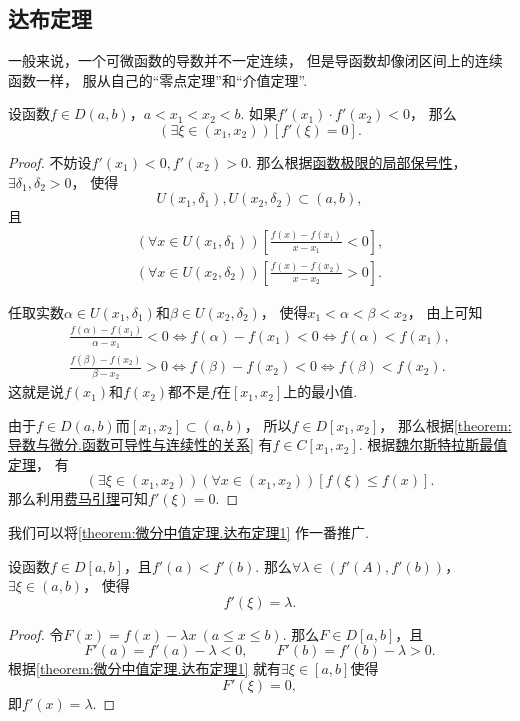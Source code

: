 \subsection{达布定理}
一般来说，一个可微函数的导数并不一定连续，
但是导函数却像闭区间上的连续函数一样，
服从自己的“零点定理”和“介值定理”.

\begin{theorem}[达布零点定理]\label{theorem:微分中值定理.达布定理1}
设函数\(f \in D(a,b)\)，\(a<x_1<x_2<b\).
如果\(f'(x_1) \cdot f'(x_2) < 0\)，
那么\[
	(\exists\xi\in(x_1,x_2))
	[f'(\xi) = 0].
\]
\begin{proof}
不妨设\(f'(x_1)<0,f'(x_2)>0\).
那么根据\hyperref[theorem:极限.函数极限的局部保号性1]{函数极限的局部保号性}，
\(\exists\delta_1,\delta_2>0\)，
使得\[
	U(x_1,\delta_1),U(x_2,\delta_2)\subset(a,b),
\]
且\[
	\begin{split}
		(\forall x \in U(x_1,\delta_1))
		\left[\frac{f(x)-f(x_1)}{x-x_1}<0\right], \\
		(\forall x \in U(x_2,\delta_2))
		\left[\frac{f(x)-f(x_2)}{x-x_2}>0\right].
	\end{split}
\]

任取实数\(\alpha \in U(x_1,\delta_1)\)和\(\beta \in U(x_2,\delta_2)\)，
使得\(x_1<\alpha<\beta<x_2\)，
由上可知\[
	\begin{split}
		\frac{f(\alpha)-f(x_1)}{\alpha-x_1}<0
		\iff
		f(\alpha)-f(x_1)<0
		\iff
		f(\alpha)<f(x_1), \\
		\frac{f(\beta)-f(x_2)}{\beta-x_2}>0
		\iff
		f(\beta)-f(x_2)<0
		\iff
		f(\beta)<f(x_2).
	\end{split}
\]
这就是说\(f(x_1)\)和\(f(x_2)\)都不是\(f\)在\([x_1,x_2]\)上的最小值.

由于\(f \in D(a,b)\)而\([x_1,x_2]\subset(a,b)\)，
所以\(f \in D[x_1,x_2]\)，
那么根据\cref{theorem:导数与微分.函数可导性与连续性的关系}
有\(f \in C[x_1,x_2]\).
根据\hyperref[theorem:极限.最值定理]{魏尔斯特拉斯最值定理}，
有\[
	(\exists\xi\in(x_1,x_2))
	(\forall x\in(x_1,x_2))
	[f(\xi) \leq f(x)].
\]
那么利用\hyperref[theorem:微分中值定理.费马引理]{费马引理}可知\(f'(\xi)=0\).
\end{proof}
\end{theorem}

我们可以将\cref{theorem:微分中值定理.达布定理1} 作一番推广.
\begin{theorem}[达布介值定理]\label{theorem:微分中值定理.达布定理2}
设函数\(f \in D[a,b]\)，且\(f'(a) < f'(b)\).
那么\(\forall\lambda\in(f'(A),f'(b))\)，\(\exists\xi\in(a,b)\)，
使得\[
	f'(\xi) = \lambda.
\]
\begin{proof}
令\(F(x) = f(x) - \lambda x\ (a \leq x \leq b)\).
那么\(F \in D[a,b]\)，且\[
	F'(a) = f'(a) - \lambda < 0, \qquad
	F'(b) = f'(b) - \lambda > 0.
\]
根据\cref{theorem:微分中值定理.达布定理1} 就有\(\exists\xi\in[a,b]\)使得\[
	F'(\xi)=0,
\]
即\(f'(x) = \lambda\).
\end{proof}
\end{theorem}

